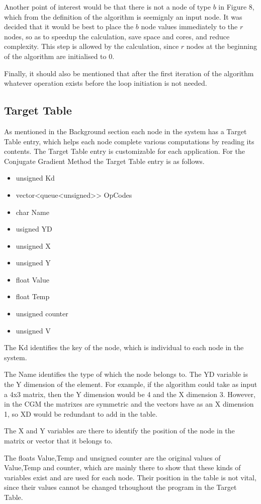 \documentclass[12pt,a4paper]{article}
\begin{document}
Another point of interest would be that there is not a node of type $b$ in Figure 8, which from the definition of the algorithm is seemignly an input node. It was decided that it would be best to place the $b$ node values immediately to the $r$ nodes, so as to speedup the calculation, save space and cores, and reduce complexity. This step is allowed by the calculation, since $r$ nodes at the beginning of the algorithm are initialised to 0.

Finally, it should also be mentioned that after the first iteration of the algorithm whatever operation exists before the loop initiation is not needed.
\subsection{Target Table}
As mentioned in the Background section each node in the system has a Target Table entry, which helps each node complete various computations by reading its contents. The Target Table entry is customizable for each application. For the Conjugate Gradient Method the Target Table entry is as follows.
\begin{itemize}
\item unsigned Kd
\item vector<queue<unsigned>> OpCodes
\item char Name
\item usigned YD
\item unsigned X
\item unsigned Y
\item float Value
\item float Temp
\item unsigned counter
\item unsigned V
\end{itemize}

The Kd identifies the key of the node, which is individual to each node in the system. 

The Name identifies the type of which the node belongs to. The YD variable is the Y dimension of the element. For example, if the algorithm could take as input a 4x3 matrix, then the Y dimension would be 4 and the X dimension 3. However, in the CGM the matrixes are symmetric and the vectors have as an X dimension 1, so XD would be redundant to add in the table. 

The X and Y variables are there to identify the position of the node in the matrix or vector that it belongs to. 

The floats Value,Temp and unsigned counter are the original values of Value,Temp and counter, which are mainly there to show that these kinds of variables exist and are used for each node. Their position in the table is not vital, since their values cannot be changed trhoughout the program in the Target Table. 
\end{document}
